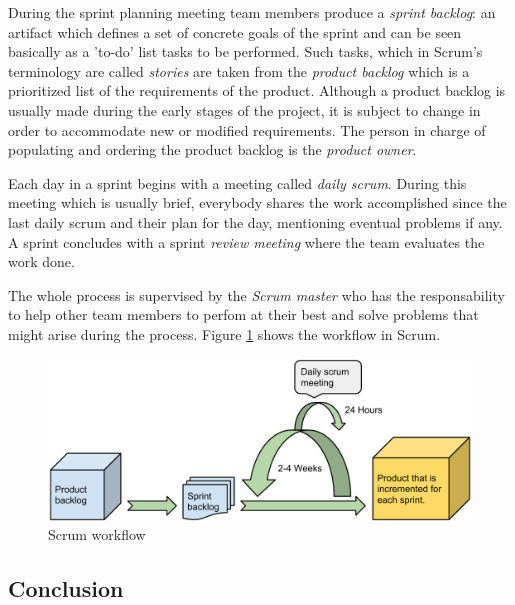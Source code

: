 During the sprint planning meeting team members produce a \emph{sprint backlog}: an artifact which defines a
set of concrete goals of the sprint and can be seen basically as a 'to-do' list tasks to be performed.
Such tasks, which in Scrum's terminology are called \emph{stories} are taken from the \emph{product backlog} which
is a prioritized list of the requirements of the product. Although a product backlog is usually made during the early
stages of the project, it is subject to change in order to accommodate new or modified requirements. 
The person in charge of populating and ordering the product backlog is the \emph{product owner}.

Each day in a sprint begins with a meeting called \emph{daily scrum}. 
During this meeting which is usually brief, everybody shares the work accomplished since the last daily
scrum and their plan for the day, mentioning eventual problems if any. 
A sprint concludes with a sprint \textit{review meeting} where the team evaluates the work done.

The whole process is supervised by the \textit{Scrum master} who has the responsability to
help other team members to perfom at their best and solve problems that might arise during the process.
Figure \ref{figure:scrum-workflow} shows the workflow in Scrum. \cite{Compendium}

\begin{figure}[h]
\begin{center}
\includegraphics[scale=0.5]{../Figures/Scrum-workflow.pdf}
\end{center}
\caption{Scrum workflow}
\label{figure:scrum-workflow}
\end{figure}

\subsection{Conclusion}
\label{subsec:devprocess}

